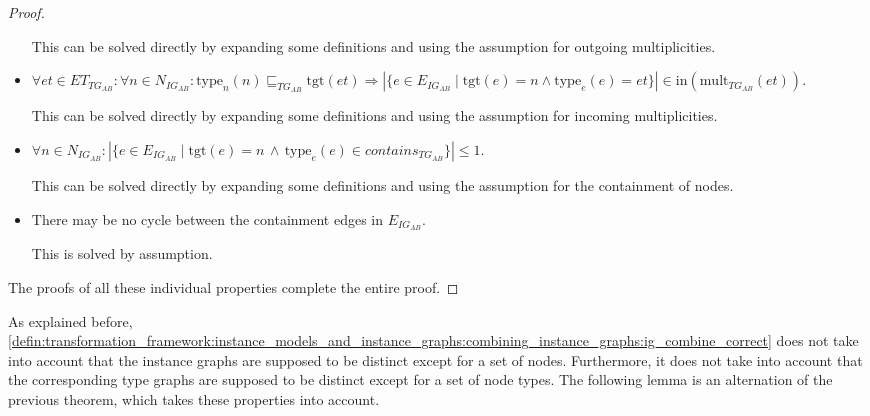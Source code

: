 \begin{proof}
\begin{itemize}
    This can be solved directly by expanding some definitions and using the assumption for outgoing multiplicities.
    
    
    \item $\forall et \in ET_{TG_{AB}}\!: \forall n \in N_{IG_{AB}}\!: \mathrm{type}_n(n) \sqsubseteq_{TG_{AB}} \mathrm{tgt}(et) \Longrightarrow |\{e \in E_{IG_{AB}} \mid \mathrm{tgt}(e) = n \land \mathrm{type}_e(e) = et\}| \in \mathrm{in}(\mathrm{mult}_{TG_{AB}}(et))$.
    
    This can be solved directly by expanding some definitions and using the assumption for incoming multiplicities.
    
    
    \item $\forall n \in N_{IG_{AB}}\!: |\{e \in E_{IG_{AB}} \mid \mathrm{tgt}(e) = n\,\land\,\mathrm{type}_e(e) \in contains_{TG_{AB}}\}| \leq 1$.
    
    This can be solved directly by expanding some definitions and using the assumption for the containment of nodes.
    
    
    \item There may be no cycle between the containment edges in $E_{IG_{AB}}$.
    
    This is solved by assumption.
\end{itemize}

The proofs of all these individual properties complete the entire proof.
\end{proof}

As explained before, \cref{defin:transformation_framework:instance_models_and_instance_graphs:combining_instance_graphs:ig_combine_correct} does not take into account that the instance graphs are supposed to be distinct except for a set of nodes. Furthermore, it does not take into account that the corresponding type graphs are supposed to be distinct except for a set of node types. The following lemma is an alternation of the previous theorem, which takes these properties into account.

